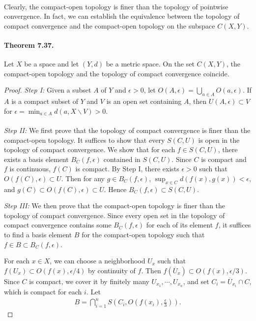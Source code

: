 \documentclass{article}
\numberwithin{equation}{section}
\theoremstyle{plain}
\theoremstyle{definition}
\begin{document}
\paragraph{} Clearly, the compact-open topology is finer than the topology of pointwise convergence. In fact, we can establish the equivalence between the topology of compact convergence and the compact-open topology on the subspace $C(X,Y)$.

\paragraph{Theorem 7.37.\label{thm:7.37}}  Let $X$ be a space and let $(Y,d)$ be a metric space. On the set $C(X,Y)$,
the compact-open topology and the topology of compact convergence coincide.
\begin{proof}
\textit{Step I:} Given a subset $A$ of $Y$ and $\epsilon>0$, let $O(A,\epsilon)=\bigcup_{a\in A}O(a,\epsilon)$. If $A$ is a compact subset of $Y$ and $V$ is an open set containing $A$, then $U(A,\epsilon)\subset V$ for $\epsilon=\min_{a\in A}d(a,X\backslash V) > 0$.

\paragraph{}
\textit{Step II:} We first prove that the topology of compact convergence is finer than the compact-open topology. It suffices to show that every $S(C,U)$ is open in the topology of compact convergence. We show that for each $f\in S(C,U)$, there exists a basis element $B_C(f,\epsilon)$ contained in $S(C,U)$. Since $C$ is compact and $f$ is continuous, $f(C)$ is compact. By Step I, there exists $\epsilon > 0$ such that $O(f(C),\epsilon)\subset U$. Then for any $g\in B_C(f,\epsilon)$, $\sup_{x\in C}d(f(x),g(x))<\epsilon$, and $g(C)\subset O(f(C),\epsilon)\subset U$. Hence $B_C(f,\epsilon)\subset S(C,U)$.

\vspace{0.12cm}
\textit{Step III:} We then prove that the compact-open topology is finer than the topology of compact convergence. Since every open set in the topology of compact convergence contains some $B_C(f,\epsilon)$ for each of its element $f$, it suffices to find a basis element $B$ for the compact-open topology such that $f\in B\subset B_C(f,\epsilon)$.

For each $x\in X$, we can choose a neighborhood $U_x$ such that $f(U_x)\subset O(f(x),\epsilon/4)$ by continuity of $f$. Then $f(\overline{U}_x)\subset O(f(x),\epsilon/3)$. Since $C$ is compact, we cover it by finitely many $U_{x_1},\cdots,U_{x_n}$, and set $C_i=\overline{U}_{x_i}\cap C$, which is compact for each $i$. Let
\begin{align*}
	B=\bigcap_{i=1}^n S\left(C_i,O\left(f(x_i),\frac{\epsilon}{3}\right)\right).
\end{align*}


\end{proof}
\end{document}
